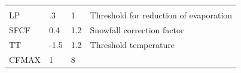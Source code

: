 \documentclass[
]{book}
\begin{document}
\begin{longtable}[]{@{}llll@{}}
\begin{minipage}[t]{0.31\columnwidth}
\end{minipage}\tabularnewline
\begin{minipage}[t]{0.29\columnwidth}\raggedright
LP\strut
\end{minipage} & \begin{minipage}[t]{0.16\columnwidth}\raggedright
.3\strut
\end{minipage} & \begin{minipage}[t]{0.13\columnwidth}\raggedright
1\strut
\end{minipage} & \begin{minipage}[t]{0.31\columnwidth}\raggedright
Threshold for reduction of evaporation\strut
\end{minipage}\tabularnewline
\begin{minipage}[t]{0.29\columnwidth}\raggedright
SFCF\strut
\end{minipage} & \begin{minipage}[t]{0.16\columnwidth}\raggedright
0.4\strut
\end{minipage} & \begin{minipage}[t]{0.13\columnwidth}\raggedright
1.2\strut
\end{minipage} & \begin{minipage}[t]{0.31\columnwidth}\raggedright
Snowfall correction factor\strut
\end{minipage}\tabularnewline
\begin{minipage}[t]{0.29\columnwidth}\raggedright
TT\strut
\end{minipage} & \begin{minipage}[t]{0.16\columnwidth}\raggedright
-1.5\strut
\end{minipage} & \begin{minipage}[t]{0.13\columnwidth}\raggedright
1.2\strut
\end{minipage} & \begin{minipage}[t]{0.31\columnwidth}\raggedright
Threshold temperature\strut
\end{minipage}\tabularnewline
\begin{minipage}[t]{0.29\columnwidth}\raggedright
CFMAX\strut
\end{minipage} & \begin{minipage}[t]{0.16\columnwidth}\raggedright
1\strut
\end{minipage} & \begin{minipage}[t]{0.13\columnwidth}\raggedright
8\strut
\end{minipage} & \begin{minipage}[t]{0.31\columnwidth}\raggedright

\end{minipage}
\end{longtable}
\end{document}
